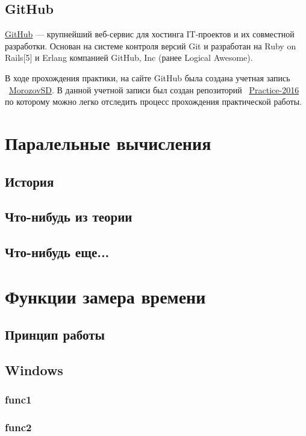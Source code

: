 \documentclass{article}
\begin{document}
		\subsection{GitHub}
			\href{https://github.com/}{GitHub} — крупнейший веб-сервис для хостинга IT-проектов и их совместной разработки. 				Основан на системе контроля	версий Git и разработан на Ruby on Rails[5] и Erlang компанией GitHub, Inc (ранее Logical 				Awesome).
			
			В ходе прохождения практики, на сайте GitHub была создана учетная запись ~\href{https://github.com/MorozovSD}					{MorozovSD}. В данной учетной записи был создан репозиторий ~\href{https://github.com/MorozovSD/Practice-2016}						{Practice-2016} по которому можно легко отследить процесс прохождения практической работы.
	\newpage
	\section{Паралельные вычисления}
		\subsection{История}
		\subsection{Что-нибудь из теории}
		\subsection{Что-нибудь еще...}
	\newpage
	\section{Функции замера времени}
		\subsection{Принцип работы}
		\subsection{Windows}
			\subsubsection{func1}
			\subsubsection{func2}
\end{document}
